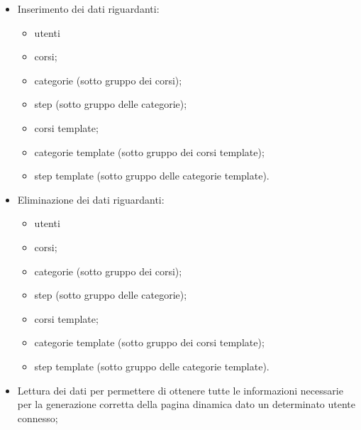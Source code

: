 \begin{itemize}
	\item Inserimento dei dati riguardanti:
		\begin{itemize}
			\item utenti
			\item corsi;
			\item categorie (sotto gruppo dei corsi);
			\item step (sotto gruppo delle categorie);
			\item corsi template;
			\item categorie template (sotto gruppo dei corsi template);
			\item step template (sotto gruppo delle categorie template).
		\end{itemize}
	\item Eliminazione dei dati riguardanti:
		\begin{itemize}
			\item utenti
			\item corsi;
			\item categorie (sotto gruppo dei corsi);
			\item step (sotto gruppo delle categorie);
			\item corsi template;
			\item categorie template (sotto gruppo dei corsi template);
			\item step template (sotto gruppo delle categorie template).
		\end{itemize}
	\item Lettura dei dati per permettere di ottenere tutte le informazioni necessarie
		per la generazione corretta della pagina dinamica dato un determinato utente
		connesso;
\end{itemize}
%
